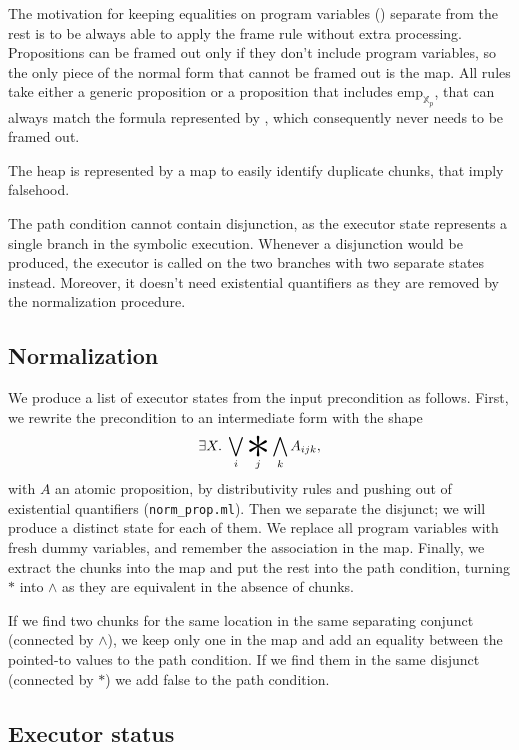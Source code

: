 \documentclass{scrartcl}
\begin{document}
The motivation for keeping equalities on program variables () separate from the rest is to be always able to apply the frame rule without extra processing. Propositions can be framed out only if they don't include program variables, so the only piece of the normal form that cannot be framed out is the  map. All rules take either a generic proposition or a proposition that includes \(\mathrm{emp}_{\mathbb X_{p}}\), that can always match the formula represented by , which consequently never needs to be framed out.

The heap is represented by a map to easily identify duplicate chunks, that imply falsehood.

The path condition cannot contain disjunction, as the executor state represents a single branch in the symbolic execution. Whenever a disjunction would be produced, the executor is called on the two branches with two separate states instead. Moreover, it doesn't need existential quantifiers as they are removed by the normalization procedure.

\subsection{Normalization}

We produce a list of executor states from the input precondition as follows.
First, we rewrite the precondition to an intermediate form with the shape
\[\exists X.\;\bigvee_{i}\bigast_{j}\bigwedge_{k} A_{ijk},\]
with \(A\) an atomic proposition, by distributivity rules and pushing out of existential quantifiers (\texttt{norm\_prop.ml}). Then we separate the disjunct; we will produce a distinct state for each of them. We replace all program variables with fresh dummy variables, and remember the association in the  map. Finally, we extract the chunks into the  map and put the rest into the path condition, turning \(\ast\) into \(\wedge\) as they are equivalent in the absence of chunks.

If we find two chunks for the same location in the same separating conjunct (\ie connected by \(\wedge\)), we keep only one in the  map and add an equality between the pointed-to values to the path condition. If we find them in the same disjunct (connected by \(\ast\)) we add false to the path condition.

\subsection{Executor status}
\end{document}
